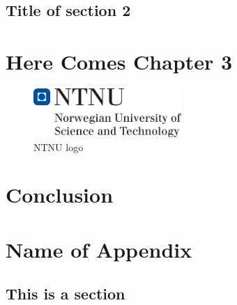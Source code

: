 \documentclass{tpk4170report}
\begin{document}
\section{Title of section 2}








\chapter{Here Comes Chapter 3}

\Blindtext

\begin{figure}
  \centering
  \includegraphics[width=0.5\textwidth]{hovedlogo} 
  \caption{NTNU logo}
  \label{fig:logo}
\end{figure}





\chapter{Conclusion}

\blindtext[4]



\printbibliography[title=References]

\appendix
\chapter{Name of Appendix} 

\section{This is a section}
\end{document}
